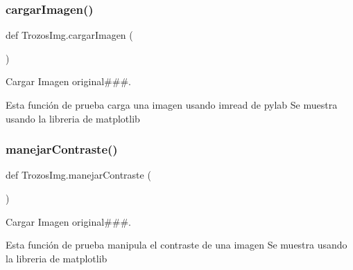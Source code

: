 \subsubsection{\texorpdfstring{cargar\+Imagen()}{cargarImagen()}}
{\footnotesize\ttfamily def Trozos\+Img.\+cargar\+Imagen (\begin{DoxyParamCaption}{ }\end{DoxyParamCaption})}



Cargar Imagen original\#\#\#. 

\begin{DoxyVerb}Esta función de prueba carga una imagen usando imread de pylab
Se muestra usando la libreria de matplotlib
\end{DoxyVerb}
 \mbox{\label{namespace_trozos_img_a5a058cc8df2ddeae9201cded551a0a74}} 
\subsubsection{\texorpdfstring{manejar\+Contraste()}{manejarContraste()}}
{\footnotesize\ttfamily def Trozos\+Img.\+manejar\+Contraste (\begin{DoxyParamCaption}{ }\end{DoxyParamCaption})}



Cargar Imagen original\#\#\#. 

\begin{DoxyVerb}Esta función de prueba manipula el contraste de una imagen
Se muestra usando la libreria de matplotlib
\end{DoxyVerb}
 